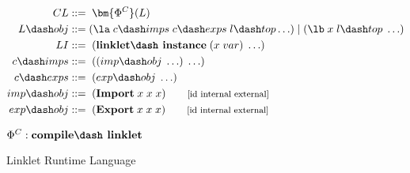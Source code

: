 \begin{figure}[!htbp]
    \centering
    \begin{align*}
    CL             &::=\; \bm{\Phi^C}(L)\\
    L\dash obj     &::= (\la\; c\dash imps \; c\dash exps \; l\dash top \ldots) \;|\; (\lb\; x\; l\dash top\; \ldots)\\
    LI             &::=\; (\textbf{linklet\dash instance}\; (x\; var)\; \ldots) \\
    c\dash imps    &::=\; ((imp\dash obj\; \ldots)\; \ldots)\\
    c\dash exps    &::=\; (exp\dash obj\; \ldots)\\
    imp\dash obj   &::=\; (\textbf{Import}\; x\; x\; x) \qquad\text{\footnotesize[id internal external]} \\
    exp\dash obj   &::=\; (\textbf{Export}\; x\; x\; x) \qquad\text{\footnotesize[id internal external]} \\
	\end{align*}

    \vspace{-1em}

    \footnotesize $\Phi^C : \textbf{compile\dash linklet}$
    \caption{Linklet Runtime Language}
    \label{fig:linklet-runtime-language}
\end{figure}